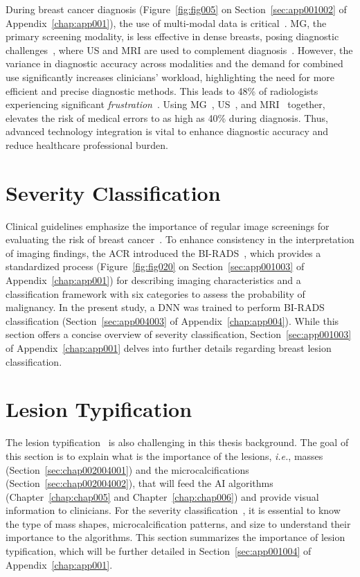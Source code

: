 \textcolor{revised}{During breast cancer diagnosis (Figure~\ref{fig:fig005} on Section~\ref{sec:app001002} of Appendix~\ref{chap:app001}), the use of multi-modal data is critical~\cite{10.1117/1.JBO.22.4.046008}.
\ac{MG}, the primary screening modality, is less effective in dense breasts, posing diagnostic challenges~\cite{10.1093/jbi/wbaa010}, where \ac{US} and \ac{MRI} are used to complement diagnosis~\cite{SHAN2016980}.
However, the variance in diagnostic accuracy across modalities and the demand for combined use significantly increases clinicians' workload, highlighting the need for more efficient and precise diagnostic methods.
This leads to 48\% of radiologists experiencing significant {\it frustration}~\cite{CALISTO2021102607}.
Using \ac{MG}~\cite{10.1001/jamaoncol.2023.4519}, \ac{US}~\cite{doi:10.1200/JGO.19.00127}, and \ac{MRI}~\cite{doi:10.1148/radiol.2021210325} together, elevates the risk of medical errors to as high as 40\% during diagnosis.
Thus, advanced technology integration is vital to enhance diagnostic accuracy and reduce healthcare professional burden.}

\section{Severity Classification}
\label{sec:chap002003}

Clinical guidelines emphasize the importance of regular image screenings for evaluating the risk of breast cancer~\cite{MIAO201817}.
To enhance consistency in the interpretation of imaging findings, the \acs{ACR} introduced the \acs{BI-RADS}~\cite{d2018breast}, which provides a standardized process (Figure~\ref{fig:fig020} on Section~\ref{sec:app001003} of Appendix~\ref{chap:app001}) for describing imaging characteristics and a classification framework with six categories to assess the probability of malignancy.
In the present study, a \acs{DNN} was trained to perform \acs{BI-RADS} classification (Section~\ref{sec:app004003} of Appendix~\ref{chap:app004}).
While this section offers a concise overview of severity classification, Section~\ref{sec:app001003} of Appendix~\ref{chap:app001} delves into further details regarding breast lesion classification.

\section{Lesion Typification}
\label{sec:chap002004}

The lesion typification~\cite{doi:10.1148/radiol.2018181371} is also challenging in this thesis background.
The goal of this section is to explain what is the importance of the lesions, {\it i.e.}, masses (Section~\ref{sec:chap002004001}) and the microcalcifications (Section~\ref{sec:chap002004002}), that will feed the \ac{AI} algorithms (Chapter~\ref{chap:chap005} and Chapter~\ref{chap:chap006}) and provide visual information to clinicians.
For the severity classification~\cite{8611096, 9231684}, it is essential to know the type of mass shapes, microcalcification patterns, and size to understand their importance to the algorithms.
This section summarizes the importance of lesion typification, which will be further detailed in Section~\ref{sec:app001004} of Appendix~\ref{chap:app001}.

